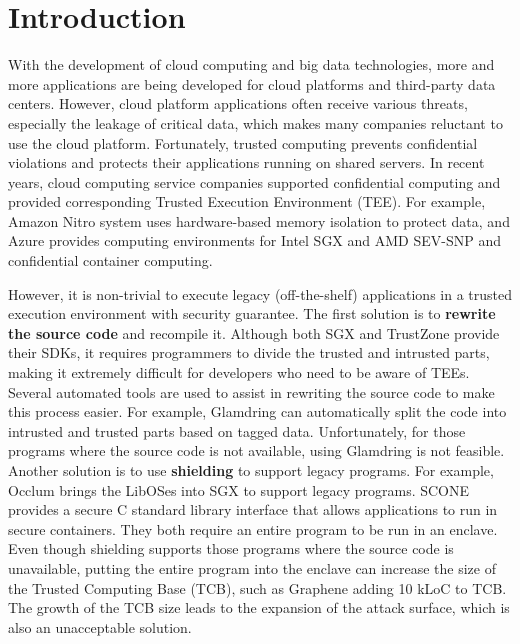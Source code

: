 \section{Introduction}
With the development of cloud computing and big data technologies,
more and more applications are being developed for cloud platforms
and third-party data centers. However, cloud platform applications
often receive various threats, especially the leakage of critical data,
which makes many companies reluctant to use the cloud platform.
Fortunately, trusted computing prevents confidential violations and
protects their applications running on shared servers.
In recent years, cloud computing service companies supported confidential
computing and provided corresponding Trusted Execution Environment (TEE).
For example, Amazon Nitro system \cite{AmazonNitro} uses hardware-based memory
isolation to protect data, and Azure \cite{AzureDocs} provides computing environments
for Intel SGX and AMD SEV-SNP and confidential container computing.

However, it is non-trivial to execute legacy (off-the-shelf) applications
in a trusted execution environment with security guarantee.
The first solution is to \textbf{rewrite the source code} and recompile it.
Although both SGX and TrustZone provide their SDKs, it requires programmers
to divide the trusted and intrusted parts, making it extremely difficult for
developers who need to be aware of TEEs. Several automated tools are used to assist
in rewriting the source code to make this process easier.
For example, Glamdring \cite{Lind2017GlamdringAA} can automatically
split the code into intrusted and trusted parts based on tagged data.
Unfortunately, for those programs where the source code is not available,
using Glamdring is not feasible.
Another solution is to use \textbf{shielding} to support legacy programs.
For example, Occlum \cite{Shen2020OcclumSA} brings the LibOSes
into SGX to support legacy programs. SCONE \cite{Arnautov2016SCONESL}
provides a secure C standard library interface that allows applications to
run in secure containers. They both require an entire program to be run in an enclave.
Even though shielding supports those programs where the source code is unavailable,
putting the entire program into the enclave can increase the size of the
Trusted Computing Base (TCB), such as Graphene \cite{Tsai2017GrapheneSGXAP}
adding 10 kLoC to TCB.
The growth of the TCB size leads to the expansion of the attack surface,
which is also an unacceptable solution.


